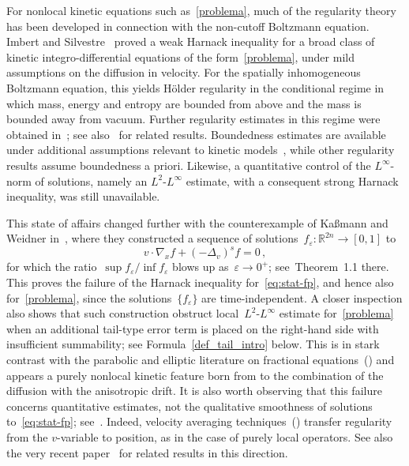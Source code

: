 \documentclass[leqno,10pt]{amsart}
\theoremstyle{plain}
\theoremstyle{remark}
\numberwithin{equation}{section}
\def\er{\mathbb{R}}
\newcommand{\eps}{\varepsilon}
\begin{document}
\medskip
For nonlocal kinetic equations such as~\eqref{problema}, much of the regularity theory has been developed in connection with the non-cutoff Boltzmann equation.
Imbert and Silvestre~\cite{IS20} proved a weak Harnack inequality for a broad class of kinetic integro-differential equations of the form~\eqref{problema}, under mild assumptions on the diffusion in velocity.
For the spatially inhomogeneous Boltzmann equation, this yields H\"older regularity in the conditional regime in which mass, energy and entropy are bounded from above and the mass is bounded away from vacuum.
Further regularity estimates in this regime were obtained in~\cite{IS22}; see also~\cite{Sto19,Loh22} for related results.
Boundedness estimates are available under additional assumptions relevant to kinetic models~\cite{Sil16,OS23,FRW24}, while other regularity results assume boundedness a priori.
Likewise, a quantitative control of the $L^\infty$-norm of solutions, namely an $L^2$-$L^\infty$ estimate, with a consequent strong Harnack inequality, was still unavailable.


\medskip
This state of affairs changed further with the counterexample of {Ka\ss mann and Weidner} in~\cite{KW24c}, where they constructed a sequence of solutions~$f_\eps: \er^{2n} \to [0,1]$ to
\begin{equation}\label{eq:stat-fp}
	v \cdot \nabla_x f + (-\Delta_v)^sf=0\,,
\end{equation}
for which
the ratio~$\sup f_\eps /\inf f_\eps$ blows up as~$\eps \to 0^+$; see~Theorem~1.1 there. This proves the failure of the Harnack inequality for~\eqref{eq:stat-fp}, and hence also for~\eqref{problema}, since the solutions~$\{f_\eps\}$ are time-independent.
A closer inspection also shows that such construction obstruct local~$L^2$-$L^\infty$ estimate for~\eqref{problema} when an additional tail-type error term is placed on the right-hand side with insufficient summability; see Formula~\eqref{def_tail_intro} below. This is in stark contrast with the parabolic and elliptic literature on fractional equations~(\!\!\cite{DKP16,KW23,KW24}) and appears a purely nonlocal kinetic  feature born from to the combination of the  diffusion with the anisotropic  drift. It is also worth observing that this  failure concerns quantitative estimates, not the qualitative smoothness of solutions to~\eqref{eq:stat-fp}; see~\cite{IS22}. Indeed, velocity averaging techniques~(\!\!\cite{Bou02}) transfer regularity from the $v$-variable to position, as in the case of purely local operators. See also the very recent paper~\cite{AN26} for related results in this direction.
\end{document}
